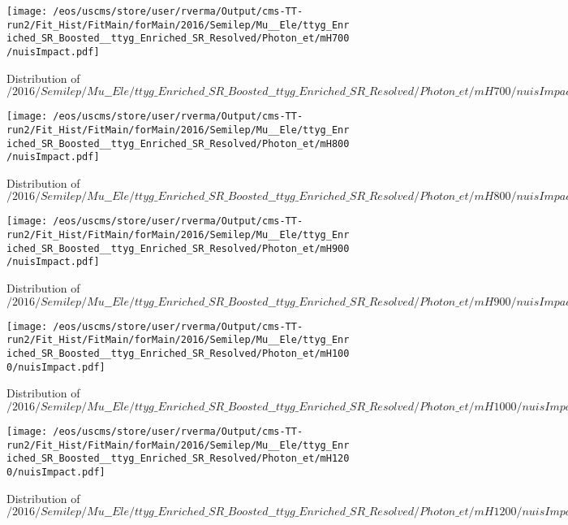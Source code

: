 \begin{figure}
\centering
\texttt{[image: /eos/uscms/store/user/rverma/Output/cms-TT-run2/Fit\_Hist/FitMain/forMain/2016/Semilep/Mu\_\_Ele/ttyg\_Enriched\_SR\_Boosted\_\_ttyg\_Enriched\_SR\_Resolved/Photon\_et/mH700/nuisImpact.pdf]}
\caption{Distribution of $/2016/Semilep/Mu\_\_Ele/ttyg\_Enriched\_SR\_Boosted\_\_ttyg\_Enriched\_SR\_Resolved/Photon\_et/mH700/nuisImpact.pdf$}
\end{figure}

\begin{figure}
\centering
\texttt{[image: /eos/uscms/store/user/rverma/Output/cms-TT-run2/Fit\_Hist/FitMain/forMain/2016/Semilep/Mu\_\_Ele/ttyg\_Enriched\_SR\_Boosted\_\_ttyg\_Enriched\_SR\_Resolved/Photon\_et/mH800/nuisImpact.pdf]}
\caption{Distribution of $/2016/Semilep/Mu\_\_Ele/ttyg\_Enriched\_SR\_Boosted\_\_ttyg\_Enriched\_SR\_Resolved/Photon\_et/mH800/nuisImpact.pdf$}
\end{figure}

\begin{figure}
\centering
\texttt{[image: /eos/uscms/store/user/rverma/Output/cms-TT-run2/Fit\_Hist/FitMain/forMain/2016/Semilep/Mu\_\_Ele/ttyg\_Enriched\_SR\_Boosted\_\_ttyg\_Enriched\_SR\_Resolved/Photon\_et/mH900/nuisImpact.pdf]}
\caption{Distribution of $/2016/Semilep/Mu\_\_Ele/ttyg\_Enriched\_SR\_Boosted\_\_ttyg\_Enriched\_SR\_Resolved/Photon\_et/mH900/nuisImpact.pdf$}
\end{figure}

\begin{figure}
\centering
\texttt{[image: /eos/uscms/store/user/rverma/Output/cms-TT-run2/Fit\_Hist/FitMain/forMain/2016/Semilep/Mu\_\_Ele/ttyg\_Enriched\_SR\_Boosted\_\_ttyg\_Enriched\_SR\_Resolved/Photon\_et/mH1000/nuisImpact.pdf]}
\caption{Distribution of $/2016/Semilep/Mu\_\_Ele/ttyg\_Enriched\_SR\_Boosted\_\_ttyg\_Enriched\_SR\_Resolved/Photon\_et/mH1000/nuisImpact.pdf$}
\end{figure}

\begin{figure}
\centering
\texttt{[image: /eos/uscms/store/user/rverma/Output/cms-TT-run2/Fit\_Hist/FitMain/forMain/2016/Semilep/Mu\_\_Ele/ttyg\_Enriched\_SR\_Boosted\_\_ttyg\_Enriched\_SR\_Resolved/Photon\_et/mH1200/nuisImpact.pdf]}
\caption{Distribution of $/2016/Semilep/Mu\_\_Ele/ttyg\_Enriched\_SR\_Boosted\_\_ttyg\_Enriched\_SR\_Resolved/Photon\_et/mH1200/nuisImpact.pdf$}
\end{figure}

